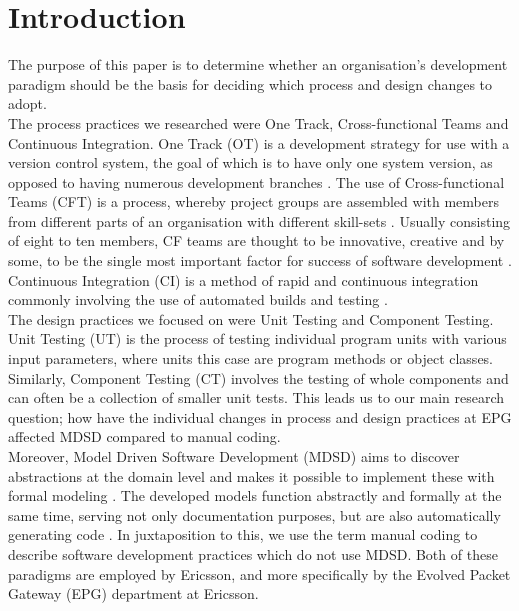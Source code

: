 \documentclass[fina_report_innit.tex]{subfiles}
\begin{document}
\section{Introduction}

The purpose of this paper is to determine whether an organisation's development paradigm should be the basis for deciding which process and design changes to adopt. 
\\

The process practices we researched were One Track, Cross-functional Teams and Continuous Integration. One Track (OT) is a development strategy for use with a version control system, the goal of which is to have only one system version, as opposed to having numerous development branches \cite{hribar2008first}. The use of Cross-functional Teams (CFT) is a process, whereby project groups are assembled with members from different parts of an organisation with different skill-sets \cite{henke1993perspective}\cite{ghobadi2011challenges}. Usually consisting of eight to ten members, CF teams are thought to be innovative, creative \cite{ghobadi2011challenges} and by some, to be the single most important factor for success of software development \cite{marchwinski2000technical}. Continuous Integration (CI) is a method of rapid and continuous integration commonly involving the use of automated builds and testing \cite{sommerville10software}.  
\\

The design practices we focused on were Unit Testing and Component Testing. Unit Testing (UT) is the process of testing individual program units with various input parameters, where units this case are program methods or object classes. Similarly, Component Testing (CT) involves the testing of whole components and can often be a collection of smaller unit tests. This leads us to our main research question; how have the individual changes in process and design practices at EPG affected MDSD compared to manual coding.
\\

Moreover, Model Driven Software Development (MDSD) aims to discover abstractions at the domain level and makes it possible to implement these with formal modeling \cite{stahl2006model}. The developed models function abstractly and formally at the same time, serving not only documentation purposes, but are also automatically generating code \cite{stahl2006model}. In juxtaposition to this, we use the term manual coding to describe software development practices which do not use MDSD. Both of these paradigms are employed by Ericsson, and more specifically by the Evolved Packet Gateway (EPG) department at Ericsson.
\\
\end{document}
